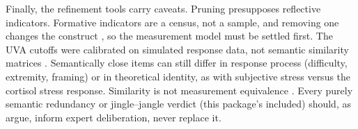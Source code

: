 Finally, the refinement tools carry caveats. Pruning presupposes
reflective indicators. Formative indicators are a census, not a sample,
and removing one changes the construct \citep{bollen-lennox-1991}, so
the measurement model must be settled first. The UVA cutoffs were
calibrated on simulated response data, not semantic similarity matrices
\citep{christensen-etal-2023}. Semantically close items can still differ
in response process (difficulty, extremity, framing) or in theoretical
identity, as with subjective stress versus the cortisol stress response.
Similarity is not measurement equivalence \citep{wang-etal-2026}.
Every purely semantic redundancy or
jingle--jangle verdict (this package's included) should, as
\citet{wulff-mata-2026} argue, inform expert deliberation, never replace
it.
